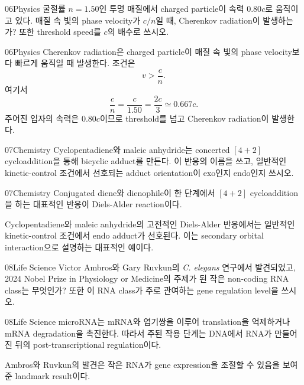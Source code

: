 \documentclass[12pt,aspectratio=169]{beamer}
\begin{document}
\begin{problemframe}{06}{Physics}
굴절률 $n=1.50$인 투명 매질에서 charged particle이 속력 $0.80c$로 움직이고 있다. 매질 속 빛의 phase velocity가 $c/n$일 때, Cherenkov radiation이 발생하는가? 또한 threshold speed를 $c$의 배수로 쓰시오.
\end{problemframe}

\begin{solutionframe}{06}{Physics}
Cherenkov radiation은 charged particle이 매질 속 빛의 phase velocity보다 빠르게 움직일 때 발생한다. 조건은
\[
v>\frac{c}{n}.
\]
여기서
\[
\frac{c}{n}=\frac{c}{1.50}=\frac{2c}{3}\simeq0.667c.
\]
주어진 입자의 속력은 $0.80c$이므로 threshold를 넘고 Cherenkov radiation이 발생한다.
\end{solutionframe}

\begin{problemframe}{07}{Chemistry}
Cyclopentadiene와 maleic anhydride는 concerted $[4+2]$ cycloaddition을 통해 bicyclic adduct를 만든다. 이 반응의 이름을 쓰고, 일반적인 kinetic-control 조건에서 선호되는 adduct orientation이 exo인지 endo인지 쓰시오.
\end{problemframe}

\begin{solutionframe}{07}{Chemistry}
Conjugated diene와 dienophile이 한 단계에서 $[4+2]$ cycloaddition을 하는 대표적인 반응이 Diels-Alder reaction이다.

Cyclopentadiene와 maleic anhydride의 고전적인 Diels-Alder 반응에서는 일반적인 kinetic-control 조건에서 endo adduct가 선호된다. 이는 secondary orbital interaction으로 설명하는 대표적인 예이다.
\end{solutionframe}

\begin{problemframe}{08}{Life Science}
Victor Ambros와 Gary Ruvkun의 \textit{C. elegans} 연구에서 발견되었고, 2024 Nobel Prize in Physiology or Medicine의 주제가 된 작은 non-coding RNA class는 무엇인가? 또한 이 RNA class가 주로 관여하는 gene regulation level을 쓰시오.
\end{problemframe}

\begin{solutionframe}{08}{Life Science}
microRNA는 mRNA와 염기쌍을 이루어 translation을 억제하거나 mRNA degradation을 촉진한다. 따라서 주된 작용 단계는 DNA에서 RNA가 만들어진 뒤의 post-transcriptional regulation이다.

Ambros와 Ruvkun의 발견은 작은 RNA가 gene expression을 조절할 수 있음을 보여준 landmark result이다.
\end{solutionframe}
\end{document}
